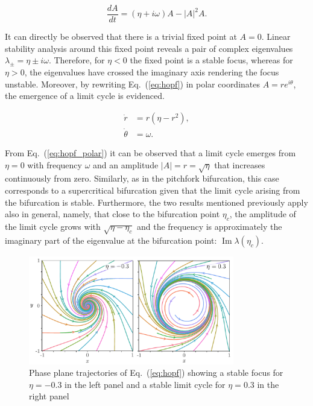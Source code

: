 \begin{equation}
    \dfrac{dA}{dt} = (\eta + i\omega)A - |A|^2 A.
     \label{eq:hopf}
\end{equation}

It can directly be observed that there is a trivial fixed point at $A=0$. Linear stability analysis around this fixed point 
reveals a pair of complex eigenvalues $\lambda_\pm = \eta \pm i\omega$. Therefore, for $\eta < 0$ the fixed point is a stable
focus, whereas for $\eta > 0$, the eigenvalues have crossed the imaginary axis rendering the focus unstable. Moreover,
by rewriting Eq.~(\ref{eq:hopf}) in polar coordinates $A = re^{i\theta}$, the emergence of a limit cycle is evidenced.

\begin{align}
    \dot{r} &= r(\eta - r^2),\\
    \dot{\theta} &= \omega.
    \label{eq:hopf_polar}
\end{align}

From Eq.~(\ref{eq:hopf_polar}) it can be observed that a limit cycle emerges from $\eta=0$ with frequency $\omega$ and an 
amplitude $|A| = r = \sqrt{\eta}$ that increases continuously from zero. 
Similarly, as in the pitchfork bifurcation, this case corresponds to a supercritical
bifurcation given that the limit cycle arising from the bifurcation is stable. Furthermore, the two results mentioned previously
apply also in general, namely, that close to the
bifurcation point $\eta_c$, the amplitude of the limit cycle grows with $\sqrt{\eta - \eta_c}$ and the frequency is approximately
the imaginary part of the eigenvalue at the bifurcation point: $\operatorname{Im}{\lambda(\eta_c)}$.


\begin{figure}[h]
    \centering
    \includegraphics[width=0.8\textwidth]{imagenes/framework/hopf_phasespace.pdf}
    \caption{Phase plane trajectories of Eq.~(\ref{eq:hopf}) showing a stable
    focus for $\eta = -0.3$ in the left panel and a stable limit cycle for $\eta=0.3$
    in the right panel}
\end{figure}

